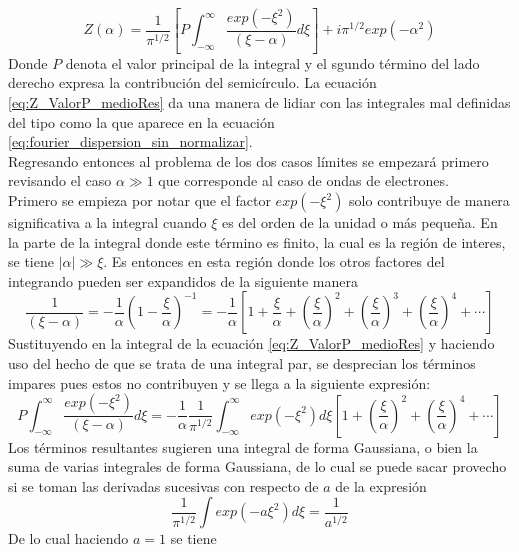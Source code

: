 \documentclass[../tesis_main_file.tex]{subfiles}
\begin{document}
\begin{equation}
\label{eq:Z_ValorP_medioRes}
Z(\alpha) = \frac{1}{\pi ^{1/2}}\left[P\int ^{\infty}_{-\infty} \frac{exp(-\xi ^2)}{(\xi -\alpha)}d\xi\right]+ i\pi^{1/2}exp(-\alpha ^2)
\end{equation}
Donde $P$ denota el valor principal de la integral y el sgundo término del lado derecho expresa la contribución del semicírculo. La ecuación \ref{eq:Z_ValorP_medioRes} da una manera de lidiar con las integrales mal definidas del tipo como la que aparece en la ecuación \ref{eq:fourier_dispersion_sin_normalizar}.\\
Regresando entonces al problema de los dos casos límites se empezará primero revisando el caso $\alpha \gg 1$ que corresponde al caso de ondas de electrones.\\
Primero se empieza por notar que el factor $exp(-\xi^2)$ solo contribuye de manera significativa a la integral cuando $\xi$ es del orden de la unidad o más pequeña. En la parte de la integral donde este término es finito, la cual es la región de interes, se tiene $|\alpha | \gg \xi$. 
Es entonces en esta región donde los otros factores del integrando pueden ser expandidos de la siguiente manera
\begin{equation}
\frac{1}{(\xi - \alpha)}= -\frac{1}{\alpha}\left(1-\frac{\xi}{\alpha}\right)^{-1}=-\frac{1}{\alpha}\left[1+\frac{\xi}{\alpha}+\left(\frac{\xi}{\alpha}\right)^2+\left(\frac{\xi}{\alpha}\right)^3+\left(\frac{\xi}{\alpha}\right)^4+\cdots\right]
\end{equation}
Sustituyendo en la integral de la ecuación \ref{eq:Z_ValorP_medioRes} y haciendo uso del hecho de que se trata de una integral par, se desprecian los términos impares pues estos no contribuyen y se llega a la siguiente expresión:
\begin{equation}
P\int ^{\infty}_{-\infty} \frac{exp(-\xi ^2)}{(\xi -\alpha)}d\xi = - \frac{1}{\alpha}\frac{1}{\pi ^{1/2}}\int^{\infty}_{-\infty}exp(-\xi^2)d\xi \left[1 + \left(\frac{\xi}{\alpha}\right)^2 + \left(\frac{\xi}{\alpha}\right)^4 + \cdots \right]
\end{equation}
Los términos resultantes sugieren una integral de forma Gaussiana, o bien la suma de varias integrales de forma Gaussiana, de lo cual se puede sacar provecho si se toman las derivadas sucesivas con respecto de $a$ de la expresión
\begin{equation*}
\frac{1}{\pi ^{1/2}}\int exp(-a\xi ^2)d\xi =\frac{1}{a^{1/2}}
\end{equation*}
De lo cual haciendo $a=1$ se tiene
\end{document}
